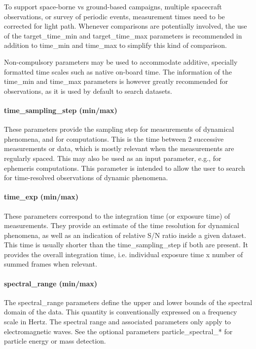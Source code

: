 \documentclass[11pt,a4paper]{ivoa}
\begin{document}
To support space-borne vs ground-based campaigns, multiple spacecraft observations, or survey of periodic events, measurement times need to be corrected for light path. Whenever comparisons are potentially involved, the use of the target\_time\_min and target\_time\_max parameters is recommended in addition to time\_min and time\_max to simplify this kind of comparison.

Non-compulsory parameters may be used to accommodate additive, specially formatted time scales such as native on-board time. The information of the time\_min and time\_max parameters is however greatly recommended for observations, as it is used by default to search datasets.

\paragraph{time\_sampling\_step (min/max)}

These parameters provide the sampling step for measurements of dynamical phenomena, and for computations. This is the time between 2 successive measurements or data, which is mostly relevant when the measurements are regularly spaced. This may also be used as an input parameter, e.g., for ephemeris computations. This parameter is intended to allow the user to search for time-resolved observations of dynamic phenomena.

\paragraph{time\_exp (min/max)}

These parameters correspond to the integration time (or exposure time) of measurements. They provide an estimate of the time resolution for dynamical phenomena, as well as an indication of relative S/N ratio inside a given dataset. This time is usually shorter than the time\_sampling\_step if both are present. It provides the overall integration time, i.e. individual exposure time x number of summed frames when relevant. 

\paragraph{spectral\_range (min/max)}

The spectral\_range parameters define the upper and lower bounds of the spectral domain of the data. This quantity is conventionally expressed on a frequency scale in Hertz. The spectral range and associated parameters only apply to electromagnetic waves. See the optional parameters particle\_spectral\_* for particle energy or mass detection.
\end{document}
